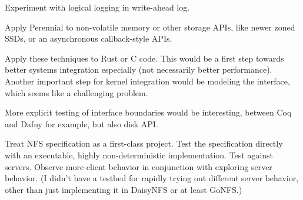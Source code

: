 Experiment with logical logging in write-ahead log.

Apply Perennial to non-volatile memory or other storage APIs, like newer zoned
SSDs, or an asynchronous callback-style APIs.

Apply these techniques to Rust or C code. This would be a first step towards
better systems integration especially (not necessarily better performance).
Another important step for kernel integration would be modeling the interface,
which seems like a challenging problem.

More explicit testing of interface boundaries would be interesting, between Coq
and Dafny for example, but also disk API.

Treat NFS specification as a first-class project. Test the specification
directly with an executable, highly non-deterministic implementation. Test
against servers. Observe more client behavior in conjunction with exploring
server behavior. (I didn't have a testbed for rapidly trying out different
server behavior, other than just implementing it in DaisyNFS or at least GoNFS.)

